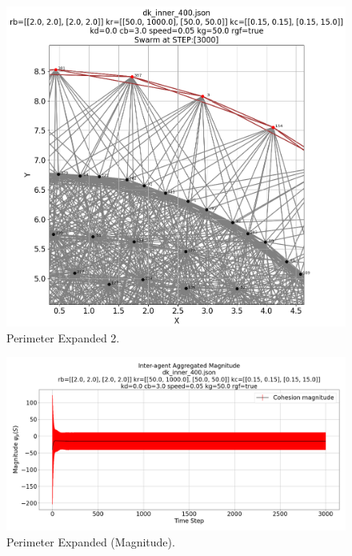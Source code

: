 \documentclass[12pt,a4paper]{IEEEtran}
\begin{document}
\begin{figure}[H]
	\begin{center}
		\includegraphics[width=1.0\linewidth]{figures/inner2}
	\end{center}
	\caption{Perimeter Expanded 2. \label{fig:perimExpand2}}
\end{figure}

\begin{figure}[H]
	\begin{center}
		\includegraphics[width=1.0\linewidth]{figures/innerMagnitude}
	\end{center}
	\caption{Perimeter Expanded (Magnitude). \label{fig:perimExpandMagnitude}}
\end{figure}
\end{document}
